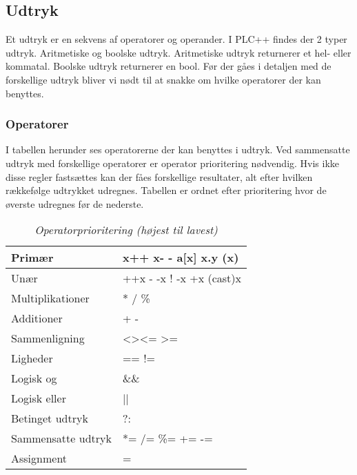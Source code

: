 \subsection{Udtryk}
Et udtryk er en sekvens af operatorer og operander. I PLC++ findes der 2 typer udtryk. Aritmetiske og boolske udtryk. Aritmetiske udtryk returnerer et hel- eller kommatal. Boolske udtryk returnerer en bool. Før der gåes i detaljen med de forskellige udtryk bliver vi nødt til at snakke om hvilke operatorer der kan benyttes.

\subsubsection{Operatorer}
I tabellen herunder ses operatorerne der kan benyttes i udtryk. Ved sammensatte udtryk med forskellige operatorer er operator prioritering nødvendig. Hvis ikke disse regler fastsættes kan der fåes forskellige resultater, alt efter hvilken rækkefølge udtrykket udregnes. Tabellen er ordnet efter prioritering hvor de øverste udregnes før de nederste.
\begin{table}[H]
    \centering
    \begin{tabular}{|l|l|}
        \hline
        \centering

        Primær             & x++ \quad x- - \quad a{[}x{]} \quad x.y \quad (x)                 \\ \hline
        Unær               & ++x \quad - -x \quad ! \quad -x \quad +x \quad (cast)x       \\ \hline
        Multiplikationer   & * \quad / \quad \%                                               \\ \hline
        Additioner         & + \quad -                                                        \\ \hline
        Sammenligning      & \textless \quad \textgreater \quad \textless= \quad\textgreater= \\ \hline
        Ligheder           & == \quad !=                                                      \\ \hline
        Logisk og          & \&\&                                                              \\ \hline
        Logisk eller       & ||                                                               \\ \hline
        Betinget udtryk    & ?:                                                               \\ \hline
        Sammensatte udtryk & *= \quad /= \quad \%= \quad += \quad -=                          \\ \hline
        Assignment         & =                                                                \\ \hline

    \end{tabular}
    \caption{\textit{Operatorprioritering (højest til lavest)}}
    \label{tab:operatorprioritering}
\end{table}
